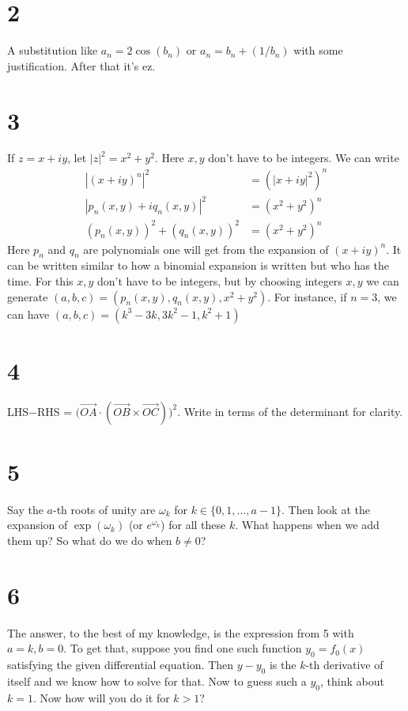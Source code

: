 \documentclass{article}
\begin{document}
\section*{2}
A substitution like $a_n = 2\cos(b_n)$ or $a_n = b_n + (1/b_n)$ with some justification. After that it's ez.

\section*{3}
If $z = x+iy$, let $|z|^2 = x^2+y^2$. Here $x,y$ don't have to be integers. We can write
\begin{align*}
    |(x+iy)^n|^2 &= (|x+iy|^2)^n \\
    |p_n(x,y) + i q_n(x,y)|^2 &= (x^2+y^2)^n \\
    \left(p_n(x,y)\right)^2 + \left(q_n(x,y)\right)^2 &= (x^2+y^2)^n
\end{align*}
Here $p_n$ and $q_n$ are polynomials one will get from the expansion of $(x+iy)^n$. It can be written similar to how a binomial expansion is written but who has the time. For this $x,y$ don't have to be integers, but by choosing integers $x,y$ we can generate $(a,b,c) = (p_n(x,y), q_n(x,y), x^2+y^2)$. For instance, if $n = 3$, we can have $(a,b,c) = (k^3 - 3k, 3k^2 - 1, k^2+1)$

\section*{4}
LHS$-$RHS = $\bigg(\overrightarrow{OA} \cdot (\overrightarrow{OB} \times \overrightarrow{OC})\bigg)^2$. Write in terms of the determinant for clarity.

\section*{5}
Say the $a$-th roots of unity are $\omega_k$ for $k\in \{0,1,\dots,a-1\}$. Then look at the expansion of $\exp(\omega_k)$ (or $e^{\omega_k}$) for all these $k$. What happens when we add them up? So what do we do when $b\neq0$?

\section*{6}
The answer, to the best of my knowledge, is the expression from 5 with $a=k,b=0$. To get that, suppose you find one such function $y_0 = f_0(x)$ satisfying the given differential equation. Then $y-y_0$ is the $k$-th derivative of itself and we know how to solve for that. Now to guess such a $y_0$, think about $k=1$. Now how will you do it for $k>1$?
\end{document}
